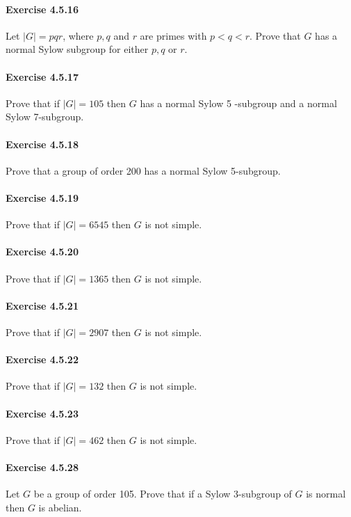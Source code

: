 \documentclass{article}
\theoremstyle{definition}
\begin{document}
\paragraph{Exercise 4.5.16} Let $|G|=p q r$, where $p, q$ and $r$ are primes with $p<q<r$. Prove that $G$ has a normal Sylow subgroup for either $p, q$ or $r$.

\paragraph{Exercise 4.5.17} Prove that if $|G|=105$ then $G$ has a normal Sylow 5 -subgroup and a normal Sylow 7-subgroup.

\paragraph{Exercise 4.5.18} Prove that a group of order 200 has a normal Sylow 5-subgroup.

\paragraph{Exercise 4.5.19} Prove that if $|G|=6545$ then $G$ is not simple.

\paragraph{Exercise 4.5.20} Prove that if $|G|=1365$ then $G$ is not simple.

\paragraph{Exercise 4.5.21} Prove that if $|G|=2907$ then $G$ is not simple.

\paragraph{Exercise 4.5.22} Prove that if $|G|=132$ then $G$ is not simple.

\paragraph{Exercise 4.5.23} Prove that if $|G|=462$ then $G$ is not simple.

\paragraph{Exercise 4.5.28} Let $G$ be a group of order 105. Prove that if a Sylow 3-subgroup of $G$ is normal then $G$ is abelian.
\end{document}

